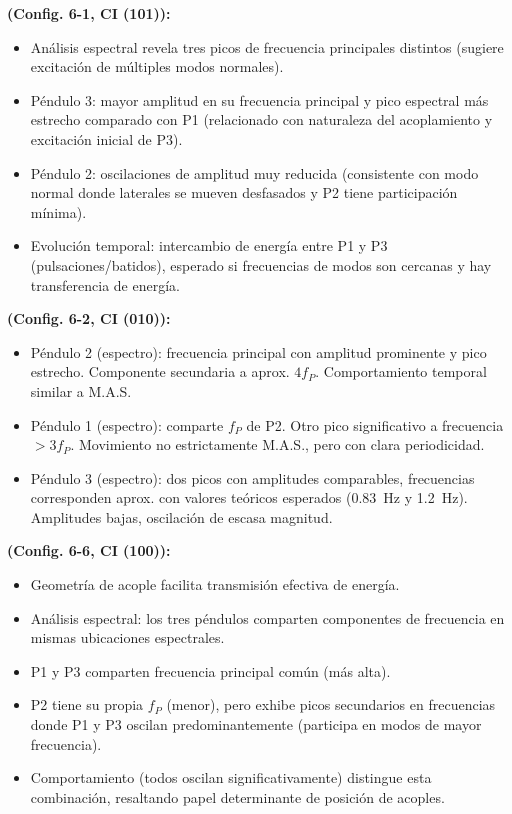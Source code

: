\textbf{ (Config. 6-1, CI (101)):}
\begin{itemize}
  \item An\'alisis espectral revela tres picos de frecuencia principales
    distintos (sugiere excitaci\'on de m\'ultiples modos normales).
  \item P\'endulo 3: mayor amplitud en su frecuencia principal y pico
    espectral m\'as estrecho comparado con P1 (relacionado con
    naturaleza del acoplamiento y excitaci\'on inicial de P3).
  \item P\'endulo 2: oscilaciones de amplitud muy reducida (consistente con
    modo normal donde laterales se mueven desfasados y P2 tiene
    participaci\'on m\'inima).
  \item Evoluci\'on temporal: intercambio de energ\'ia entre P1 y P3
    (pulsaciones/batidos), esperado si frecuencias de modos son cercanas
    y hay transferencia de energ\'ia.
\end{itemize}

\textbf{ (Config. 6-2, CI (010)):}
\begin{itemize}
  \item P\'endulo 2 (espectro): frecuencia principal con amplitud prominente y
    pico estrecho. Componente secundaria a aprox. $4 f_P$.
    Comportamiento temporal similar a M.A.S.
  \item P\'endulo 1 (espectro): comparte $f_P$ de P2. Otro pico significativo
    a frecuencia $> 3 f_P$. Movimiento no estrictamente M.A.S.,
    pero con clara periodicidad.
  \item P\'endulo 3 (espectro): dos picos con amplitudes comparables,
    frecuencias corresponden aprox. con valores te\'oricos esperados
    (\qty{0.83}{\Hz} y \qty{1.2}{\Hz}). Amplitudes bajas, oscilaci\'on
    de escasa magnitud.
\end{itemize}

\textbf{ (Config. 6-6, CI (100)):}
\begin{itemize}
  \item Geometr\'ia de acople facilita transmisi\'on efectiva de energ\'ia.
  \item An\'alisis espectral: los tres p\'endulos comparten componentes de
    frecuencia en mismas ubicaciones espectrales.
  \item P1 y P3 comparten frecuencia principal com\'un (m\'as alta).
  \item P2 tiene su propia $f_P$ (menor), pero exhibe picos secundarios en
    frecuencias donde P1 y P3 oscilan predominantemente (participa en
    modos de mayor frecuencia).
  \item Comportamiento (todos oscilan significativamente) distingue esta
    combinaci\'on, resaltando papel determinante de posici\'on de acoples.
\end{itemize}
